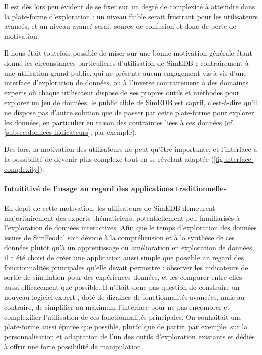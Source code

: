 			Il est dès lors peu évident de se fixer sur un degré de complexité à atteindre dans la plate-forme d'exploration : un niveau faible serait frustrant pour les utilisateurs avancés, et un niveau avancé serait source de confusion et donc de perte de motivation.

			Il nous était toutefois possible de miser sur une bonne motivation générale étant donné les circonstances particulières d'utilisation de SimEDB : contrairement à une utilisation grand public, qui ne présente aucun engagement vis-à-vis d'une interface d'exploration de données, ou à l'inverse contrairement à des domaines experts où chaque utilisateur dispose de ses propres outils et méthodes pour explorer un jeu de données, le public cible de SimEDB est \og captif\fg{}, c'est-à-dire qu'il ne dispose pas d'autre solution que de passer par cette plate-forme pour explorer les données, en particulier en raison des contraintes liées à ces données (cf. \cref{subsec:donnees-indicateurs},  par exemple).

			Dès lors, la motivation des utilisateurs ne peut qu'être importante, et l'interface a la possibilité de devenir plus complexe tout en se révélant adaptée (\cref{fig:interface-complexity}).

			\paragraph*{Intuititivé de l'usage au regard des applications traditionnelles}

			En dépit de cette motivation, les utilisateurs de SimEDB demeurent majoritairement des experts thématiciens, potentiellement peu familiarisés à l'exploration de données interactives.
			Afin que le temps d'exploration des données issues de SimFeodal soit dévoué à la compréhension et à la synthèse de ces données plutôt qu'à un apprentissage ou amélioration en exploration de données, il a été choisi de créer une application aussi simple que possible au regard des fonctionnalités principales qu'elle devait permettre : observer les indicateurs de sortie de simulation pour des expériences données, et les comparer entre elles aussi efficacement que possible.
			Il n'était donc pas question de construire un nouveau \og logiciel expert \fg{}, doté de dizaines de fonctionnalités avancées, mais au contraire, de simplifier au maximum l'interface pour ne pas encombrer et complexifier l'utilisation de ces fonctionnalités principales.
			On souhaitait une plate-forme aussi épurée que possible, plutôt que de partir, par exemple, sur la personnalisation et adaptation de l'un des outils d'exploration existants et dédiés à offrir une forte possibilité de manipulation.

